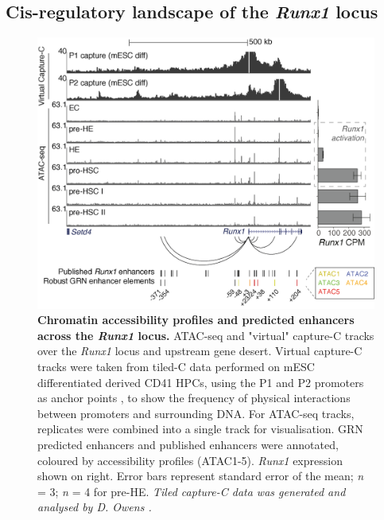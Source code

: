 \subsection{\label{ch3:runx1-landscape}Cis-regulatory landscape of the \textit{Runx1} locus}

\begin{figure}[!b]
    \centering
    \includegraphics[width=\textwidth,height=\textheight,keepaspectratio]{figures/chapter3/ch3_runx1-regulation.png}
    \caption[{Chromatin accessibility profiles and predicted enhancers across the \textit{Runx1} locus.}]
    {\textbf{Chromatin accessibility profiles and predicted enhancers across the \textit{Runx1} locus.} 
    ATAC-seq and "virtual" capture-C tracks over the \textit{Runx1} locus and upstream gene desert. Virtual capture-C tracks were taken from tiled-C data performed on mESC differentiated derived CD41\upos{} HPCs, using the P1 and P2 promoters as anchor points \citep{owens_dynamic_2022}, to show the frequency of physical interactions between promoters and surrounding DNA. For ATAC-seq tracks, replicates were combined into a single track for visualisation. GRN predicted enhancers and published enhancers \citep{owens_dynamic_2022, marsman_dna_2017, ortt_chromatin_2008, fitch_gata3_2020, cauchy_chronic_2015, cheng_runx1_2018, harland_t-box_2021, ng_runx1_2010, bee_nonredundant_2010, nottingham_runx1-mediated_2007, schutte_experimentally_2016} were annotated, coloured by accessibility profiles (ATAC1-5). \textit{Runx1} expression shown on right. Error bars represent standard error of the mean; \textit{n} = 3; \textit{n} = 4 for pre-HE. 
    \textit{Tiled capture-C data was generated and analysed by D. Owens \citep{owens_dynamic_2022}.}
    }
    \label{fig:ch3_runx1-regulation}
\end{figure}

